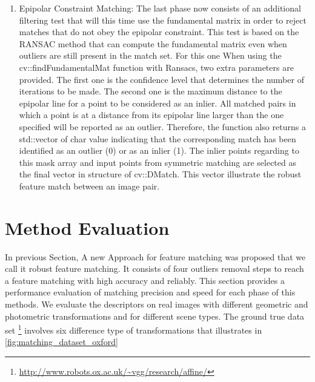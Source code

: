 \begin {enumerate}
  \item Epipolar Constraint Matching: The last phase now consists of an additional filtering test that will this time use the fundamental matrix in order to reject matches that do not obey the epipolar constraint. This test is based on the RANSAC method that can compute the fundamental matrix even when outliers are still present in the match set. For this one When using the cv::findFundamentalMat function with Ransacs, two extra parameters are provided. The first one is the confidence level that determines the number of iterations to be made. The second one is the maximum distance to the epipolar line for a point to be considered as an inlier. All matched pairs in which a point is at a distance from its epipolar line larger than the one specified will be reported as an outlier. Therefore, the function also returns a std::vector of char value indicating that the corresponding match has been identified as an outlier (0) or as an inlier (1). The inlier points regarding to this mask array and input points from symmetric matching are selected as the final vector in structure of cv::DMatch. This vector illustrate the robust feature match between an image pair.
\end {enumerate}

\section {Method Evaluation}
In previous Section, A new Approach for feature matching was proposed that we call it robust feature matching. It consists of four outliers removal steps to reach a feature matching with high accuracy and reliably. This section provides a performance evaluation of matching precision and speed for each phase of this methods. We evaluate the descriptors on real images with different geometric and photometric transformations and for different scene types. The ground true data set \footnote {\url{http://www.robots.ox.ac.uk/~vgg/research/affine/}} involves six difference type of transformations that illustrates in \autoref{fig:matching_dataset_oxford}

